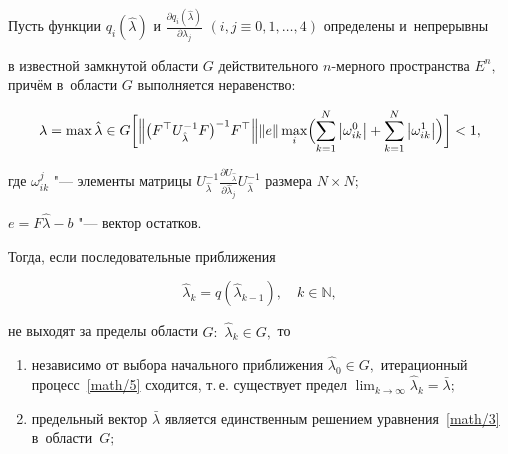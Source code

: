 


\begin{theorem}

Пусть функции   $q_i( \hat{\lambda} ) $ и  $\frac{\partial q_i( \hat{\lambda} ) }{\partial \lambda_j}$  $(i, j \equiv 0, 1, \ldots, 4)$ определены и~непрерывны

    в известной замкнутой области $G$ действительного  $n$-мерного пространства $E^n,$  причём в~области $G$ выполняется неравенство:

\begin{equation}

\label{math/4}

        \lambda=\max{\hat{\lambda}\in G} \biggl[\Bigl\| \bigl( F^{\top}U^{-1}_{\hat{\lambda}}F \bigr) ^{-1}F^{\top}\Bigr\|\|e\|\max_i 

        \Bigl( \sum_{k=1}^{N}\left|\omega ^{0}_{ik}\right|+\sum_{k=1}^{N}\left|\omega ^{1}_{ik}\right| \Bigr) \biggr]<1, 

    \end{equation}

    где $\omega ^{j}_{ik}$ "---  элементы матрицы $U^{-1}_{\hat{\lambda}}\frac{\partial U_{\hat{\lambda}}}{\partial\hat{\lambda}_j}U^{-1}_{\hat{\lambda}}$  размера  $N{\times }N;$

    $e=F\hat{\lambda}-b$ "--- вектор остатков. 

    

    Тогда,  если последовательные приближения

    \begin{equation}

        \label{math/5}

        \hat{\lambda}_k=q( \hat{\lambda}_{k-1} ) , \quad  k \in \mathbb N, 

    \end{equation}

    не выходят за пределы области $G{:}$ $\hat{\lambda}_k \in G,$  то

    \begin{enumerate}

        \item[\rm 1)] независимо от выбора начального приближения $\hat{\lambda}_{0}\in G,$  итерационный процесс~\eqref{math/5} сходится,  т.\,е. существует предел $\lim_{k\to\infty}\hat{\lambda}_k=\bar{\lambda};$

        \item[\rm 2)] предельный вектор $\bar{\lambda}$  является единственным решением уравнения~\eqref{math/3} в~области~$G;$


\end{enumerate}
\end{theorem}
